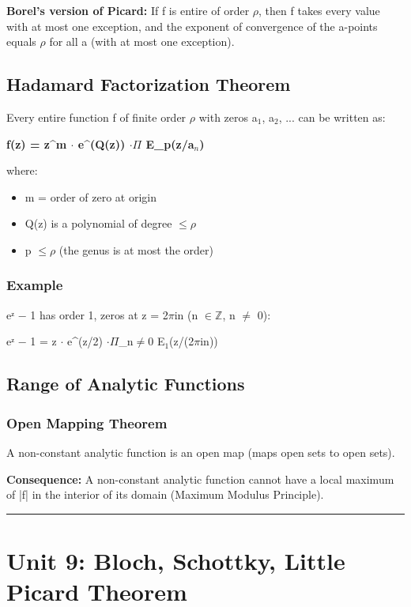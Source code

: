 \documentclass[12pt,a4paper,openany]{book}
\begin{document}
{{\textbf{Borel's version of Picard:} If f is entire of order $\rho$, then f takes every value with at most one exception, and the exponent of convergence of the a-points equals $\rho$ for all a (with at most one exception).

\subsection{Hadamard Factorization Theorem }

Every entire function f of finite order $\rho$ with zeros a$_1$, a$_2$, ... can be written as:

\textbf{f(z) = z^m $\cdot$ e^(Q(z)) $\cdot\Pi$ E_p(z/a$_n$)}

where:
\begin{itemize}[leftmargin=*]
  \item m = order of zero at origin
  \item Q(z) is a polynomial of degree $\leq\rho$
  \item p $\leq\rho$ (the genus is at most the order)
\end{itemize}

\subsubsection{Example}
eᶻ − 1 has order 1, zeros at z = 2$\pi$in (n $\in\mathbb{Z}$, n $\neq$ 0):

eᶻ − 1 = z $\cdot$ e^(z/2) $\cdot\Pi$_{n$\neq$0} E$_1$(z/(2$\pi$in))

\subsection{Range of Analytic Functions}

\subsubsection{Open Mapping Theorem }
A non-constant analytic function is an open map (maps open sets to open sets).

\textbf{Consequence:} A non-constant analytic function cannot have a local maximum of |f| in the interior of its domain (Maximum Modulus Principle).

\bigskip\noindent\rule{\textwidth}{0.4pt}\bigskip

\section{Unit 9: Bloch, Schottky, Little Picard Theorem }

}}
\end{document}
